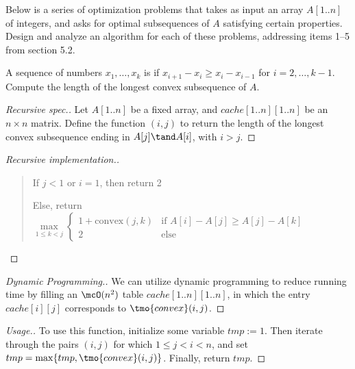 \documentclass{article}
\begin{document}
 Below is a series of optimization problems that takes as input an array $A[1..n]$ of integers, and asks for optimal subsequences of $A$ satisfying certain properties. Design and analyze an algorithm for each of these problems, addressing items 1--5 from section 5.2.
\setcounter{section}{5}
\setcounter{exercise}{1}
\setcounter{subexercise}{1}
\begin{subexercise}
  A sequence of numbers $ x_1,\ldots,x_k $ is  if $ x_{i+1}-x_i \geq x_i-x_{i-1} $ for $ i=2,\ldots,k-1 $. Compute the length of the longest convex subsequence of $ A $.
\end{subexercise}

\begin{proof}[Recursive spec.]
Let $ A[1..n] $ be a fixed array, and $ cache[1..n][1..n] $ be an $ n\times n $ matrix. Define the function $(i,j)$ to return the length of the longest convex subsequence ending in $A[j]\tand A[i]$, with $i>j$.
\end{proof}

\begin{proof}[Recursive implementation.]\
\begin{quote}
\begin{steps}
  \item If $ j < 1 $ or $ i = 1 $, then return 2
  \item Else, return $ \max\limits_{1\leq k < j}
  \begin{cases}
    1 + \text{convex}(j, k) & \text{if } A[i] - A[j] \geq A[j] - A[k] \\
    2 & \text{else}
  \end{cases} $
\end{steps}
\end{quote}
\end{proof}

\begin{proof}[Dynamic Programming.]
 We can utilize dynamic programming to reduce running time by filling an $ \mcO(n^2) $ table $ cache[1..n][1..n] $, in which the entry $ cache[i][j] $ corresponds to $ \tmo{convex}(i,j) $.
\end{proof}

\begin{proof}[Usage.]
  To use this function, initialize some variable $ tmp := 1 $. Then iterate through the pairs $ (i,j) $ for which $ 1 \leq j < i < n $, and set $ tmp = \max\{tmp, \tmo{convex}(i,j)\} $. Finally, return $ tmp $.
\end{proof}
\end{document}

